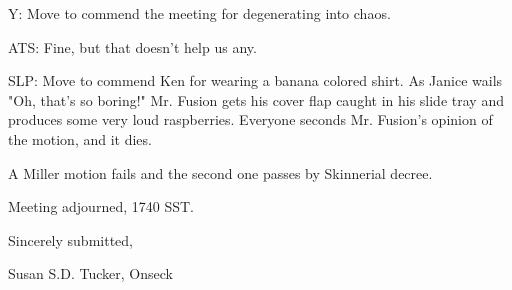 \documentclass[12pt]{article}
\begin{document}
Y: Move to commend the meeting for degenerating into chaos.

ATS: Fine, but that doesn't help us any.

SLP: Move to commend Ken for wearing a banana colored shirt. As Janice wails "Oh, that's so boring!" Mr. Fusion gets his cover flap caught in his slide tray and produces some very loud raspberries. Everyone seconds Mr. Fusion's opinion of the motion, and it dies.

A Miller motion fails and the second one passes by Skinnerial decree.

\vspace{12pt}

\noindent
Meeting adjourned, 1740 SST.

\vspace{18pt}

\centerline{Sincerely submitted,}
\centerline{Susan S.D. Tucker, Onseck}
\end{document}
